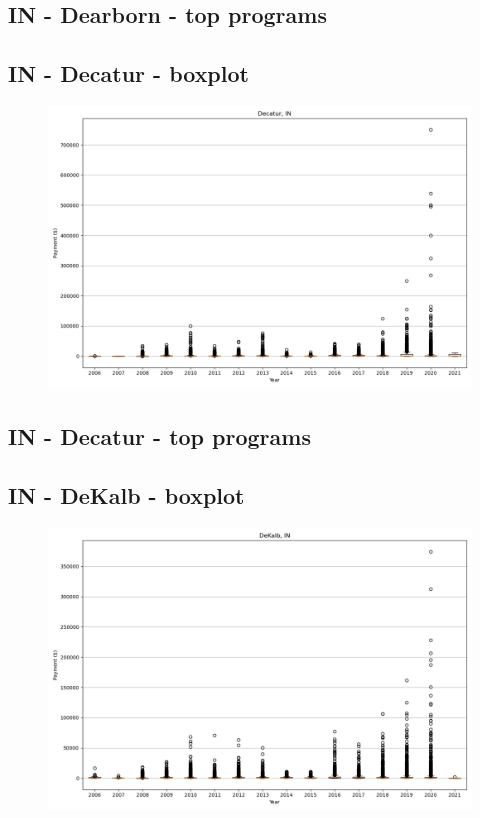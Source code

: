 \subsection*{IN - Dearborn - top programs}

\newpage
\subsection*{IN - Decatur - boxplot}
\begin{figure}[h]
\centering
\includegraphics[width=7in]{../output/boxplots/counties/Decatur-IN_boxplot.png}
\end{figure}


\subsection*{IN - Decatur - top programs}

\newpage
\subsection*{IN - DeKalb - boxplot}
\begin{figure}[h]
\centering
\includegraphics[width=7in]{../output/boxplots/counties/DeKalb-IN_boxplot.png}
\end{figure}


